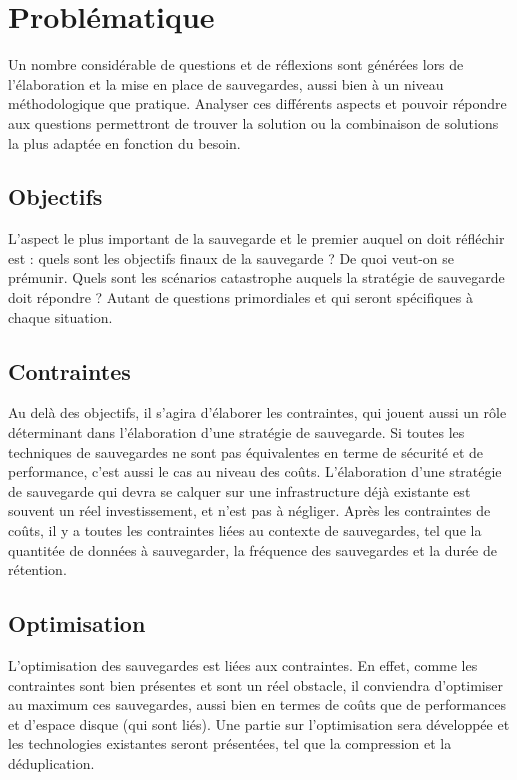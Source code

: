 \documentclass[a4paper,11pt]{report}
\begin{document}
\section{Problématique}

Un nombre considérable de questions et de réflexions sont générées lors de l'élaboration et la mise en place de sauvegardes, aussi bien à un niveau méthodologique que pratique.
Analyser ces différents aspects et pouvoir répondre aux questions permettront de trouver la solution ou la combinaison de solutions la plus adaptée en fonction du besoin.

\subsection{Objectifs}

L'aspect le plus important de la sauvegarde et le premier auquel on doit réfléchir est : quels sont les objectifs finaux de la sauvegarde ?
De quoi veut-on se prémunir. Quels sont les scénarios catastrophe auquels la stratégie de sauvegarde doit répondre ? 
Autant de questions primordiales et qui seront spécifiques à chaque situation.

\subsection{Contraintes}
Au delà des objectifs, il s'agira d'élaborer les contraintes, qui jouent aussi un rôle déterminant dans l'élaboration d'une stratégie de sauvegarde.
Si toutes les techniques de sauvegardes ne sont pas équivalentes en terme de sécurité et de performance, c'est aussi le cas au niveau des coûts.
L'élaboration d'une stratégie de sauvegarde qui devra se calquer sur une infrastructure déjà existante est souvent un réel investissement, et n'est pas à négliger.
Après les contraintes de coûts, il y a toutes les contraintes liées au contexte de sauvegardes, tel que la quantitée de données à sauvegarder, la fréquence des sauvegardes et la durée de rétention.

\subsection{Optimisation}
L'optimisation des sauvegardes est liées aux contraintes.
En effet, comme les contraintes sont bien présentes et sont un réel obstacle, il conviendra d'optimiser au maximum ces sauvegardes, aussi bien en termes de coûts que de performances et d'espace disque (qui sont liés).
Une partie sur l'optimisation sera développée et les technologies existantes seront présentées, tel que la compression et la déduplication.
\end{document}
